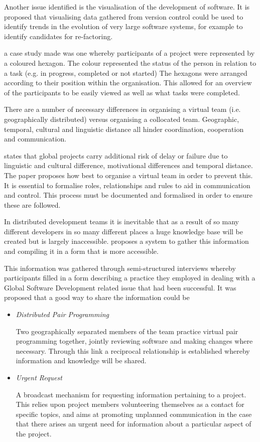 \documentclass{l4proj}
\begin{document}
Another issue identified is the visualisation of the development of software.  It is proposed that visualising data gathered from version control could be used to identify trends in the evolution of very large software systems, for example to identify candidates for re-factoring.  

a case study made was one whereby participants of a project were represented by a coloured hexagon.  The colour represented the status of the person in relation to a task (e.g. in progress, completed or not started)
The hexagons were arranged according to their position within the organisation.  This allowed for an overview of the participants to be easily viewed as well as what tasks were completed.

There are a number of necessary differences in organising a virtual team (i.e. geographically distributed) versus organising a collocated team.  Geographic, temporal, cultural and linguistic distance all hinder coordination, cooperation and communication. 

\citet{casey10virtual} states that global projects carry additional risk of delay or failure due to linguistic and cultural difference, motivational differences and temporal distance.  The paper proposes how best to organise a virtual team in order to prevent this.  It is essential to formalise roles, relationships and rules to aid in communication and control.  This process must be documented and formalised in order to ensure these are followed. 

In distributed development teams it is inevitable that as a result of so many different developers in so many different places a huge knowledge base will be created but is largely inaccessible.  \citet{bass07collaborative} proposes a system to gather this information and compiling it in a form that is more accessible.

This information was gathered through semi-structured interviews whereby participants filled in a form describing a practice they employed in dealing with a Global Software Development related issue that had been successful.  It was proposed that a good way to share the information could be

\begin{itemize}
\item \textit{Distributed Pair Programming} \par
Two geographically separated members of the team practice virtual pair programming together, jointly reviewing software and making changes where necessary.  Through this link a reciprocal relationship is established whereby information and knowledge will be shared.
\item\textit{Urgent Request} \par
A broadcast mechanism for requesting information pertaining to a project.  This relies upon project members volunteering themselves as a contact for specific topics, and aims at promoting unplanned communication in the case that there arises an urgent need for information about a particular aspect of the project.
\end{itemize}
\end{document}
